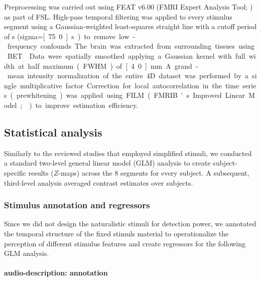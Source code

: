 \documentclass[english]{article}
\begin{document}
Preprocessing was carried out using FEAT v6.00 (FMRI Expert Analysis Tool;
\citep{woolrich2001autocorr}) as part of FSL.
High-pass temporal filtering was applied to every stimulus segment using a
Gaussian-weighted least-squares straight line with a cutoff period of
\unit[150]{s} (sigma=\unit[75.0]{s}) to remove low-frequency confounds.
The brain was extracted from surrounding tissues using BET \citep{smith2002bet}.
Data were spatially smoothed applying a Gaussian kernel with full width at half
maximum (FWHM) of \unit[4.0]{mm}.
A grand-mean intensity normalization of the entire 4D dataset was performed by a
single multiplicative factor.
Correction for local autocorrelation in the time series (prewhitening) was
applied using FILM (FMRIB's Improved Linear Model; \citep{woolrich2001autocorr})
to improve estimation efficiency.


\subsection{Statistical analysis}

Similarly to the reviewed studies that employed simplified stimuli, we conducted
a standard two-level general linear model (GLM) analysis to create
subject-specific results ($Z$-maps) across the 8 segments for every subject. A
subsequent, third-level analysis averaged contrast estimates over subjects.


\subsubsection{Stimulus annotation and regressors}



Since we did not design the naturalistic stimuli for detection power, we
annotated the temporal structure of the fixed stimuls material to operationalize
the perception of different stimulus features and create regressors for the
following GLM analysis.


\paragraph{audio-description: annotation}
\end{document}
